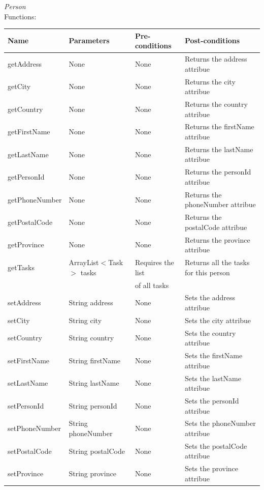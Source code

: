 \emph{Person}\\
Functions:\\
\begin{tabular}{| l | l | l | l |}
\hline
Name & Parameters & Pre-conditions & Post-conditions\\
\hline
		getAddress		& None       			& None			& Returns the address attribue\\
		getCity			& None				& None       	 	& Returns the city attribue \\
		getCountry		& None				& None       	 	& Returns the country attribue \\
		getFirstName		& None				& None       	 	& Returns the firstName attribue \\
		getLastName		& None				& None       	 	& Returns the lastName attribue \\
		getPersonId		& None				& None       	 	& Returns the personId attribue \\
		getPhoneNumber	& None				& None       	 	& Returns the phoneNumber attribue \\
		getPostalCode		& None				& None       	 	& Returns the postalCode attribue \\
		getProvince		& None				& None       	 	& Returns the province attribue \\
		getTasks		& ArrayList$<$Task$>$ tasks	& Requires the list 	& Returns all the tasks for this person \\
					& 				& of all tasks 		& \\
		setAddress		& String address  		& None			& Sets the address attribue\\
		setCity			& String city			& None       	 	& Sets the city attribue \\
		setCountry		& String country		& None       	 	& Sets the country attribue \\
		setFirstName		& String firstName		& None       	 	& Sets the firstName attribue \\
		setLastName		& String lastName		& None       	 	& Sets the lastName attribue \\
		setPersonId		& String personId		& None       	 	& Sets the personId attribue \\
		setPhoneNumber	& String phoneNumber	& None       	 	& Sets the phoneNumber attribue \\
		setPostalCode		& String postalCode		& None       	 	& Sets the postalCode attribue \\
		setProvince		& String province		& None       	 	& Sets the province attribue
\\
\hline
\end{tabular}
\\

